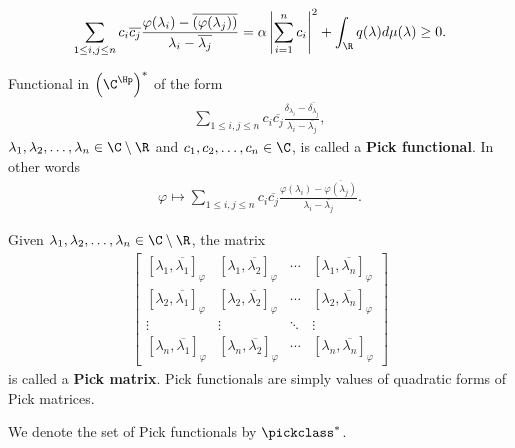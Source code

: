 \begin{align*}
	\sum_{1 \leq i, j \leq n} c_{i} \overline{c_{j}} \frac{\varphi(\lambda_{i}) - \overline{(\varphi(\lambda_{j}))}}{\lambda_{i} - \overline{\lambda_{j}}} = \alpha \left|\sum_{i = 1}^{n} c_{i}\right|^2 + \int_{\R} q(\lambda) d \mu (\lambda) \geq 0.
\end{align*}

\begin{maar}
	Functional in $\left(\C^{\Hp}\right)^{*}$ of the form
	\begin{align*}
		\sum_{1 \leq i, j \leq n} c_{i} \overline{c_{j}} \frac{\delta_{\lambda_{i}} - \overline{\delta_{\lambda_{j}}}}{\lambda_{i} - \overline{\lambda_{j}}},
	\end{align*}
	$\lambda_{1}, \lambda_{2}, \ldots, \lambda_{n} \in \C \setminus \R$ and $c_{1}, c_{2}, \ldots, c_{n} \in \C$, is called a \textbf{Pick functional}. In other words
	\begin{align*}
		\varphi \mapsto \sum_{1 \leq i, j \leq n} c_{i} \overline{c_{j}} \frac{\varphi(\lambda_{i}) - \overline{\varphi(\lambda_{j})}}{\lambda_{i} - \overline{\lambda_{j}}}.
	\end{align*}
\end{maar}

Given $\lambda_{1}, \lambda_{2}, \ldots, \lambda_{n} \in \C \setminus \R$, the matrix
\begin{align*}\label{Pick_matrix}
	\begin{bmatrix}
		[\lambda_{1}, \overline{\lambda_{1}}]_{\varphi} & [\lambda_{1}, \overline{\lambda_{2}}]_{\varphi} & \cdots & [\lambda_{1}, \overline{\lambda_{n}}]_{\varphi} \\
		[\lambda_{2}, \overline{\lambda_{1}}]_{\varphi} & [\lambda_{2}, \overline{\lambda_{2}}]_{\varphi} & \cdots & [\lambda_{2}, \overline{\lambda_{n}}]_{\varphi} \\
		\vdots & \vdots & \ddots & \vdots \\
		[\lambda_{n}, \overline{\lambda_{1}}]_{\varphi} & [\lambda_{n}, \overline{\lambda_{2}}]_{\varphi} & \cdots &  [\lambda_{n}, \overline{\lambda_{n}}]_{\varphi}
	\end{bmatrix}
\end{align*}
is called a \textbf{Pick matrix}. Pick functionals are simply values of quadratic forms of Pick matrices.

We denote the set of Pick functionals by $\pickclass^{*}$.


